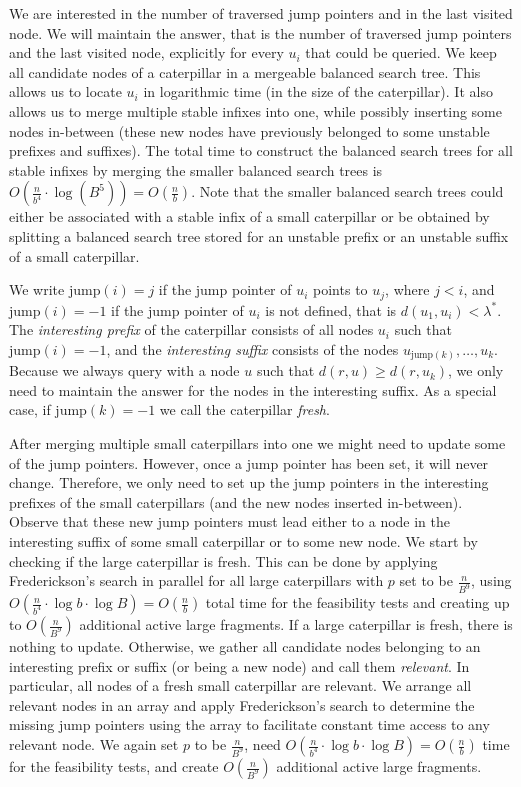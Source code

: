 \documentclass[a4paper,UKenglish]{lipics-v2016}
\theoremstyle{plain}
\newcommand{\jump}{\text{jump}}
\begin{document}
We are interested in the number of traversed jump pointers and in the last visited node.
We will maintain the answer, that is the number of traversed jump pointers and the
last visited node, explicitly for every $u_{i}$ that could be queried.
%
We keep all candidate
nodes of a caterpillar in a mergeable balanced search tree. This allows us to locate $u_{i}$
in logarithmic time (in the size of the caterpillar). It also allows us to  
merge multiple stable infixes
into one, while possibly inserting some nodes in-between (these new nodes have previously
belonged to some unstable prefixes and suffixes). 
The total time to construct the balanced
search trees for all stable infixes by merging the smaller balanced search trees
is $O(\frac{n}{b^{4}}\cdot \log (B^{5}))=O(\frac{n}{b})$. Note that the smaller balanced search
trees could either be associated with a stable infix of a small caterpillar or be obtained
by splitting a balanced search tree stored for an unstable prefix or an unstable suffix of
a small caterpillar.


We write $\jump(i)=j$ if the jump pointer of $u_{i}$ points to $u_{j}$, where $j<i$, and $\jump(i)=-1$
if the jump pointer of $u_{i}$ is not defined, that is $d(u_{1},u_{i})<\lambda^{*}$.
The {\em interesting prefix} of the caterpillar consists of all nodes $u_{i}$ such that $\jump(i)=-1$,
and the {\em interesting suffix} consists of the nodes $u_{\jump(k)}, \ldots,u_{k}$.
Because we always query with a node $u$ such that $d(r,u) \geq d(r,u_{k})$, we only
need to maintain the answer for the nodes in the interesting suffix. As a special case,
if $\jump(k)=-1$ we call the caterpillar \emph{fresh}.

After merging multiple small caterpillars into one we might need to update some of the jump pointers.
However, once a jump pointer has been set, it will never change. Therefore, we only
need to set up the jump pointers in the interesting prefixes of the small caterpillars
(and the new nodes inserted in-between). Observe that these new jump pointers
must lead either to a node in the interesting suffix of some small caterpillar
or to some new node. We start by checking if the large caterpillar is fresh. This can be
done by applying Frederickson's search in parallel for all large caterpillars with $p$ set to
be $\frac{n}{B^{9}}$, using $O(\frac{n}{b^{4}}\cdot \log b \cdot \log B)=O(\frac{n}{b})$
total time for the feasibility tests and creating up to $O(\frac{n}{B^{9}})$ additional active large
fragments. If a large caterpillar is fresh, there is nothing to update. Otherwise,
we gather all candidate nodes belonging to
an interesting prefix or suffix (or being a new node) and call them \emph{relevant}. In particular,
all nodes of a fresh small caterpillar are relevant.
We arrange all relevant nodes in an array and apply Frederickson's search to determine the missing jump
pointers using the array to facilitate constant time access to any relevant node. We again
set $p$ to be $\frac{n}{B^{9}}$, need $O(\frac{n}{b^{4}}\cdot \log b \cdot \log B)=O(\frac{n}{b})$
time for the feasibility tests, and create $O(\frac{n}{B^{9}})$ additional active large fragments.
\end{document}
